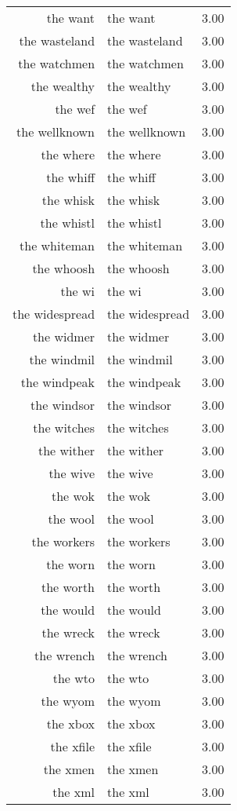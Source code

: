 \begin{table}[ht]
\begin{tabular}{rlr}
  the want & the want & 3.00 \\ 
  the wasteland & the wasteland & 3.00 \\ 
  the watchmen & the watchmen & 3.00 \\ 
  the wealthy & the wealthy & 3.00 \\ 
  the wef & the wef & 3.00 \\ 
  the wellknown & the wellknown & 3.00 \\ 
  the where & the where & 3.00 \\ 
  the whiff & the whiff & 3.00 \\ 
  the whisk & the whisk & 3.00 \\ 
  the whistl & the whistl & 3.00 \\ 
  the whiteman & the whiteman & 3.00 \\ 
  the whoosh & the whoosh & 3.00 \\ 
  the wi & the wi & 3.00 \\ 
  the widespread & the widespread & 3.00 \\ 
  the widmer & the widmer & 3.00 \\ 
  the windmil & the windmil & 3.00 \\ 
  the windpeak & the windpeak & 3.00 \\ 
  the windsor & the windsor & 3.00 \\ 
  the witches & the witches & 3.00 \\ 
  the wither & the wither & 3.00 \\ 
  the wive & the wive & 3.00 \\ 
  the wok & the wok & 3.00 \\ 
  the wool & the wool & 3.00 \\ 
  the workers & the workers & 3.00 \\ 
  the worn & the worn & 3.00 \\ 
  the worth & the worth & 3.00 \\ 
  the would & the would & 3.00 \\ 
  the wreck & the wreck & 3.00 \\ 
  the wrench & the wrench & 3.00 \\ 
  the wto & the wto & 3.00 \\ 
  the wyom & the wyom & 3.00 \\ 
  the xbox & the xbox & 3.00 \\ 
  the xfile & the xfile & 3.00 \\ 
  the xmen & the xmen & 3.00 \\ 
  the xml & the xml & 3.00 \\ 

\end{tabular}
\end{table}
